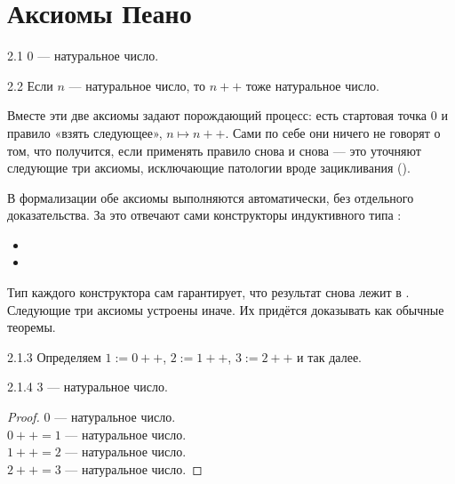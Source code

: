 \section{Аксиомы Пеано}

\begin{axiom}{2.1}{}
$0$ — натуральное число.
\end{axiom}

\begin{axiom}{2.2}{}
Если $n$ — натуральное число, то $n{+}{+}$ тоже натуральное число.
\end{axiom}

\begin{intuition}
Вместе эти две аксиомы задают порождающий процесс: есть стартовая точка $0$ и правило
«взять следующее», $n \mapsto n{+}{+}$. Сами по себе они ничего не говорят о том, что
получится, если применять правило снова и снова — это уточняют следующие три аксиомы,
исключающие патологии вроде зацикливания ().
\end{intuition}

\begin{remark}
В формализации обе аксиомы выполняются автоматически, без отдельного доказательства.
За это отвечают сами конструкторы индуктивного типа :
\begin{itemize}
  \item {}
  \item {}
\end{itemize}
Тип каждого конструктора сам гарантирует, что результат снова лежит в .
Следующие три аксиомы устроены иначе. Их придётся доказывать как обычные теоремы.
\end{remark}

\begin{definition}{2.1.3}{}
Определяем $1 := 0{+}{+}$, $2 := 1{+}{+}$, $3 := 2{+}{+}$ и так далее.
\end{definition}

\begin{proposition}{2.1.4}{}
$3$ — натуральное число.
\end{proposition}

\begin{proof}
$0$ — натуральное число.\\
$0{+}{+} = 1$ — натуральное число.\\
$1{+}{+} = 2$ — натуральное число.\\
$2{+}{+} = 3$ — натуральное число.
\end{proof}

